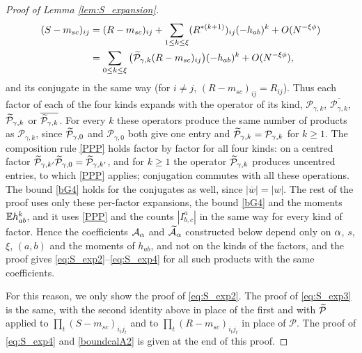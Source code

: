 \begin{proof}[Proof of Lemma \ref{lem:S_expansion}]
$$\begin{aligned}
(S-m_{sc})_{ij}&=(R-m_{sc})_{ij}+\sum_{1\le k\le\xi}(R^{*(k+1)})_{ij}(-h_{ab})^k+O(N^{-\xi\phi})\\
&=\sum_{0\le k\le\xi}\big(\widetilde{\mathcal P}_{\gamma,k}(R-m_{sc})_{ij}\big)(-h_{ab})^k+O(N^{-\xi\phi}),
\end{aligned}
$$
and its conjugate in the same way (for $i\ne j$, $(R-m_{sc})_{ij}=R_{ij}$). Thus each factor of each of the four kinds expands with the operator of its kind, $\mathcal P_{\gamma,k}$, $\overline{\mathcal P_{\gamma,k}}$, $\widetilde{\mathcal P}_{\gamma,k}$ or $\overline{\widetilde{\mathcal P}_{\gamma,k}}$. For every $k$ these operators produce the same number of products as $\mathcal P_{\gamma,k}$, since $\widetilde{\mathcal P}_{\gamma,0}$ and $\mathcal P_{\gamma,0}$ both give one entry and $\widetilde{\mathcal P}_{\gamma,k}=\mathcal P_{\gamma,k}$ for $k\ge1$. The composition rule \eqref{PPP} holds factor by factor for all four kinds: on a centred factor $\widetilde{\mathcal P}_{\gamma,k'}\widetilde{\mathcal P}_{\gamma,0}=\widetilde{\mathcal P}_{\gamma,k'}$, and for $k\ge1$ the operator $\widetilde{\mathcal P}_{\gamma,k}$ produces uncentred entries, to which \eqref{PPP} applies; conjugation commutes with all these operations. The bound \eqref{bG4} holds for the conjugates as well, since $|\overline w|=|w|$. The rest of the proof uses only these per-factor expansions, the bound \eqref{bG4} and the moments $\mathbb{E} h_{ab}^k$, and it uses \eqref{PPP} and the counts $|I^a_{b,c}|$ in the same way for every kind of factor. Hence the coefficients $\mathcal A_\alpha$ and $\widetilde{\mathcal A}_\alpha$ constructed below depend only on $\alpha$, $s$, $\xi$, $(a,b)$ and the moments of $h_{ab}$, and not on the kinds of the factors, and the proof gives \eqref{eq:S_exp2}--\eqref{eq:S_exp4} for all such products with the same coefficients.

For this reason, we only show the proof of \eqref{eq:S_exp2}. The proof of \eqref{eq:S_exp3} is the same, with the second identity above in place of the first and with $\widetilde{\mathcal P}$ applied to $\prod_{t}(S-m_{sc})_{i_tj_t}$ and to $\prod_{t}(R-m_{sc})_{i_tj_t}$ in place of $\mathcal P$. The proof of \eqref{eq:S_exp4} and \eqref{boundcalA2} is given at the end of this proof.


\end{proof}
